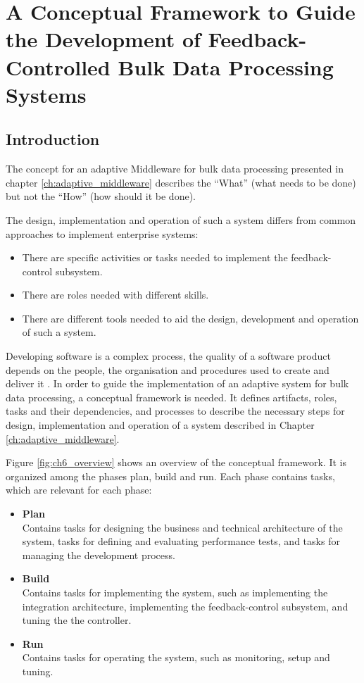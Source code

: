 

\chapter[Conceptual Framework]{A Conceptual Framework to Guide the Development of Feedback-Controlled Bulk Data Processing Systems}\label{ch:conceptual_framework}

\section{Introduction} 

The concept for an adaptive Middleware for bulk data processing presented in chapter \ref{ch:adaptive_middleware} describes the ``What'' (what needs to be done) but not the ``How'' (how should it be done).

The design, implementation and operation of such a system differs from common approaches to implement enterprise systems:
\begin{itemize}
	\item There are specific activities or tasks needed to implement the feedback-control subsystem.
	\item There are roles needed with different skills.
	\item There are different tools needed to aid the design, development and operation of such a system.
\end{itemize}

Developing software is a complex process, the quality of a software product depends on the people, the organisation and procedures used to create and deliver it \citep{Fuggetta:2000ds}.
In order to guide the implementation of an adaptive system for bulk data processing, a conceptual framework is needed. It defines artifacts, roles, tasks and their dependencies, and processes to describe the necessary steps for design, implementation and operation of a system described in Chapter \ref{ch:adaptive_middleware}.

Figure \ref{fig:ch6_overview} shows an overview of the conceptual framework. It is organized among the phases plan, build and run. Each phase contains tasks, which are relevant for each phase:
\begin{itemize}
	\item \textbf{Plan}\\
	Contains tasks for designing the business and technical architecture of the system, tasks for defining and evaluating performance tests, and tasks for managing the development process.
	\item \textbf{Build}\\
	Contains tasks for implementing the system, such as implementing the integration architecture, implementing the feedback-control subsystem, and tuning the the controller. 
	\item \textbf{Run}\\
	Contains tasks for operating the system, such as monitoring, setup and tuning.
\end{itemize}

